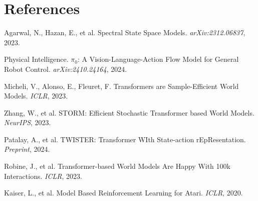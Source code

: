 \documentclass[10pt, letterpaper]{article}
\begin{document}
\section*{References}
\begin{enumerate}[leftmargin=1.5em, nosep, label={[\arabic*]}]
    \item Agarwal, N., Hazan, E., et al. Spectral State Space Models. \textit{arXiv:2312.06837}, 2023.
    \item Physical Intelligence. $\pi_0$: A Vision-Language-Action Flow Model for General Robot Control. \textit{arXiv:2410.24164}, 2024.
    \item Micheli, V., Alonso, E., Fleuret, F. Transformers are Sample-Efficient World Models. \textit{ICLR}, 2023.
    \item Zhang, W., et al. STORM: Efficient Stochastic Transformer based World Models. \textit{NeurIPS}, 2023.
    \item Patalay, A., et al. TWISTER: Transformer WIth State-action rEpResentation. \textit{Preprint}, 2024.
    \item Robine, J., et al. Transformer-based World Models Are Happy With 100k Interactions. \textit{ICLR}, 2023.
    \item Kaiser, L., et al. Model Based Reinforcement Learning for Atari. \textit{ICLR}, 2020.
\end{enumerate}
\end{document}

